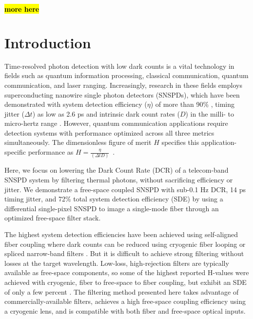 \documentclass[11pt]{caltech_thesis} %
\begin{document}
\textbf{\hl{more here}}

\hypertarget{introduction-1}{%
\section{Introduction}\label{introduction-1}}

Time-resolved photon detection with low dark counts is a vital technology in fields such as quantum information processing, classical communication, quantum communication, and laser ranging. Increasingly, research in these fields employs superconducting nanowire single photon detectors (SNSPDs), which have been demonstrated with system detection efficiency ($\eta$) of more than 90\% \autocite{Reddy2020}, timing jitter ($\Delta t$) as low as 2.6 ps \autocite{Korzh2020} and intrinsic dark count rates ($D$) in the milli- to micro-hertz range \autocite{Hochberg2019}. However, quantum communication applications require detection systems with performance optimized across all three metrics simultaneously. The dimensionless figure of merit $H$ specifies this application-specific performance as $H = \frac{\eta}{(\Delta t D)}$~\autocite{Hadfield2009}.

Here, we focus on lowering the Dark Count Rate (DCR) of a telecom-band SNSPD system by filtering thermal photons, without sacrificing efficiency or jitter. We demonstrate a free-space coupled SNSPD with sub-0.1 Hz DCR, 14 ps timing jitter, and 72\% total system detection efficiency (SDE) by using a differential single-pixel SNSPD \autocite{Colangelo2021} to image a single-mode fiber through an optimized free-space filter stack.

The highest system detection efficiencies have been achieved using self-aligned fiber coupling where dark counts can be reduced using cryogenic fiber looping \autocite{Cohen2015} or spliced narrow-band filters \autocite{Boaron2018secure}. But it is difficult to achieve strong filtering without losses at the target wavelength. Low-loss, high-rejection filters are typically available as free-space components, so some of the highest reported H-values were achieved with cryogenic, fiber to free-space to fiber coupling, but exhibit an SDE of only a few percent \autocite{Shibata2015}. The filtering method presented here takes advantage of commercially-available filters, achieves a high free-space coupling efficiency using a cryogenic lens, and is compatible with both fiber and free-space optical inputs.
\end{document}
